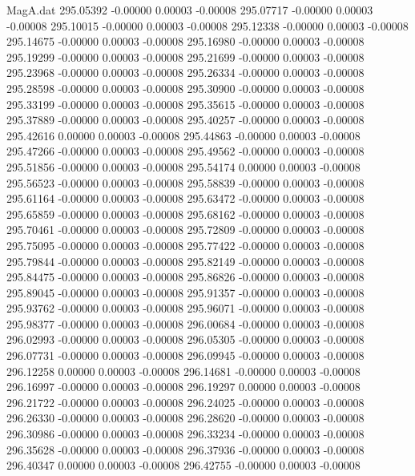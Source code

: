 \begin{filecontents}{MagA.dat}
 295.05392   -0.00000    0.00003   -0.00008
 295.07717   -0.00000    0.00003   -0.00008
 295.10015   -0.00000    0.00003   -0.00008
 295.12338   -0.00000    0.00003   -0.00008
 295.14675   -0.00000    0.00003   -0.00008
 295.16980   -0.00000    0.00003   -0.00008
 295.19299   -0.00000    0.00003   -0.00008
 295.21699   -0.00000    0.00003   -0.00008
 295.23968   -0.00000    0.00003   -0.00008
 295.26334   -0.00000    0.00003   -0.00008
 295.28598   -0.00000    0.00003   -0.00008
 295.30900   -0.00000    0.00003   -0.00008
 295.33199   -0.00000    0.00003   -0.00008
 295.35615   -0.00000    0.00003   -0.00008
 295.37889   -0.00000    0.00003   -0.00008
 295.40257   -0.00000    0.00003   -0.00008
 295.42616    0.00000    0.00003   -0.00008
 295.44863   -0.00000    0.00003   -0.00008
 295.47266   -0.00000    0.00003   -0.00008
 295.49562   -0.00000    0.00003   -0.00008
 295.51856   -0.00000    0.00003   -0.00008
 295.54174    0.00000    0.00003   -0.00008
 295.56523   -0.00000    0.00003   -0.00008
 295.58839   -0.00000    0.00003   -0.00008
 295.61164   -0.00000    0.00003   -0.00008
 295.63472   -0.00000    0.00003   -0.00008
 295.65859   -0.00000    0.00003   -0.00008
 295.68162   -0.00000    0.00003   -0.00008
 295.70461   -0.00000    0.00003   -0.00008
 295.72809   -0.00000    0.00003   -0.00008
 295.75095   -0.00000    0.00003   -0.00008
 295.77422   -0.00000    0.00003   -0.00008
 295.79844   -0.00000    0.00003   -0.00008
 295.82149   -0.00000    0.00003   -0.00008
 295.84475   -0.00000    0.00003   -0.00008
 295.86826   -0.00000    0.00003   -0.00008
 295.89045   -0.00000    0.00003   -0.00008
 295.91357   -0.00000    0.00003   -0.00008
 295.93762   -0.00000    0.00003   -0.00008
 295.96071   -0.00000    0.00003   -0.00008
 295.98377   -0.00000    0.00003   -0.00008
 296.00684   -0.00000    0.00003   -0.00008
 296.02993   -0.00000    0.00003   -0.00008
 296.05305   -0.00000    0.00003   -0.00008
 296.07731   -0.00000    0.00003   -0.00008
 296.09945   -0.00000    0.00003   -0.00008
 296.12258    0.00000    0.00003   -0.00008
 296.14681   -0.00000    0.00003   -0.00008
 296.16997   -0.00000    0.00003   -0.00008
 296.19297    0.00000    0.00003   -0.00008
 296.21722   -0.00000    0.00003   -0.00008
 296.24025   -0.00000    0.00003   -0.00008
 296.26330   -0.00000    0.00003   -0.00008
 296.28620   -0.00000    0.00003   -0.00008
 296.30986   -0.00000    0.00003   -0.00008
 296.33234   -0.00000    0.00003   -0.00008
 296.35628   -0.00000    0.00003   -0.00008
 296.37936   -0.00000    0.00003   -0.00008
 296.40347    0.00000    0.00003   -0.00008
 296.42755   -0.00000    0.00003   -0.00008

\end{filecontents}
